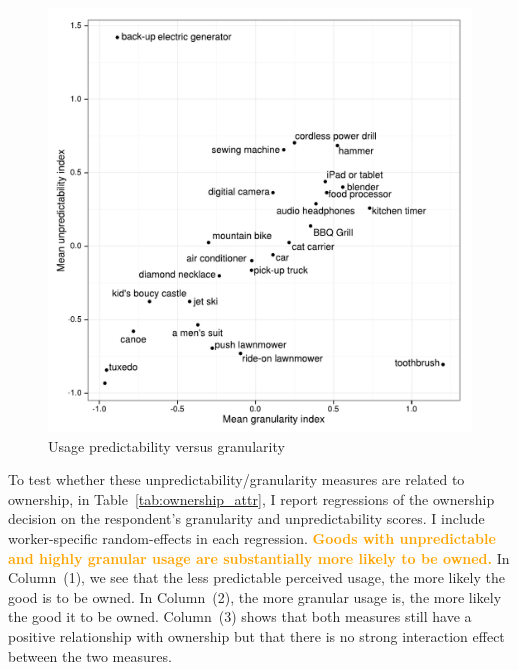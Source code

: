 \documentclass[11pt]{article}
\newcommand{\important}[1]{\textcolor{orange}{\textbf{#1}}}
\newcommand{\important}[1]{#1}
\begin{document}
\begin{figure}
\centering 
\caption{Usage predictability versus granularity \label{fig:granularity_v_predictability}}
\begin{minipage}{0.60 \linewidth}
\includegraphics[width = \linewidth]{./plots/granularity_versus_predictability.pdf} 
\end{minipage} 
\end{figure} 

To test whether these unpredictability/granularity measures are related to ownership, in Table~\ref{tab:ownership_attr}, I report regressions of the ownership decision on the respondent's granularity and unpredictability scores. 
I include worker-specific random-effects in each regression. 
\important{Goods with unpredictable and highly granular usage are substantially more likely to be owned.}
In Column~(1), we see that the less predictable perceived usage, the more likely the good is to be owned. 
In Column~(2), the more granular usage is, the more likely the good it to be owned. 
Column~(3) shows that both measures still have a positive relationship with ownership but that there is no strong interaction effect between the two measures. 

 
\end{document}
